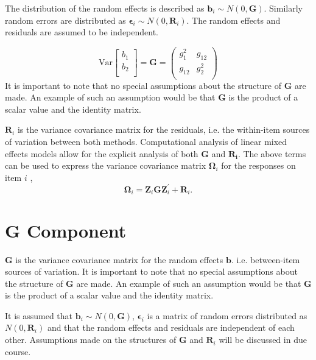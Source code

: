 \documentclass[12pt, a4paper]{report}
\theoremstyle{plain}
\theoremstyle{definition}
\theoremstyle{remark}
\begin{document}
	
	


The distribution of the random effects is described as $\boldsymbol{b}_i \sim N(0,\boldsymbol{G})$. Similarly  random errors are distributed as $\boldsymbol{\epsilon}_i \sim N(0,\boldsymbol{R}_i)$. The random effects and residuals are assumed to be independent. 

\[ \mbox{Var}  \left[
\begin{array}{c}
b_1   \\
b_2  \\
\end{array}
\right] =  \boldsymbol{G} =\left(
\begin{array}{cc}
g^2_1  & g_{12} \\
g_{12} & g^2_2 \\
\end{array}
\right) \]
It is important to note that no special assumptions about the structure of $\boldsymbol{G}$ are made. An example of such an assumption would be that $\boldsymbol{G}$ is the product of a scalar value and the identity matrix.

$\boldsymbol{R}_{i}$ is the variance covariance matrix for the residuals, i.e. the within-item sources of variation between both methods. Computational analysis of linear mixed effects models allow for the explicit analysis of both $\boldsymbol{G}$ and $\boldsymbol{R_i}$.
The above terms can be used to express the  variance covariance matrix $\boldsymbol{\Omega}_i$ for the responses on item $i$ ,
\[
\boldsymbol{\Omega}_i = \boldsymbol{Z}_i \boldsymbol{G} \boldsymbol{Z}_i^{\prime} + \boldsymbol{R}_i.
\]




\newpage\section{G Component}


$\boldsymbol{G}$ is the variance covariance matrix for the random effects $\boldsymbol{b}$.
i.e. between-item sources of variation.  
It is important to note that no special assumptions about the structure of $\boldsymbol{G}$ are made. An example of such an assumption would be that $\boldsymbol{G}$ is the product of a scalar value and the identity matrix.

It is assumed that $\boldsymbol{b}_i \sim N(0,\boldsymbol{G})$,
$\boldsymbol{\epsilon}_i$ is a matrix of random errors distributed as $N(0,\boldsymbol{R}_i)$ and
that the random effects and residuals are independent of each other. Assumptions made on the structures of $\boldsymbol{G}$ and $\boldsymbol{R}_i$ will be discussed in due course.
\end{document}
